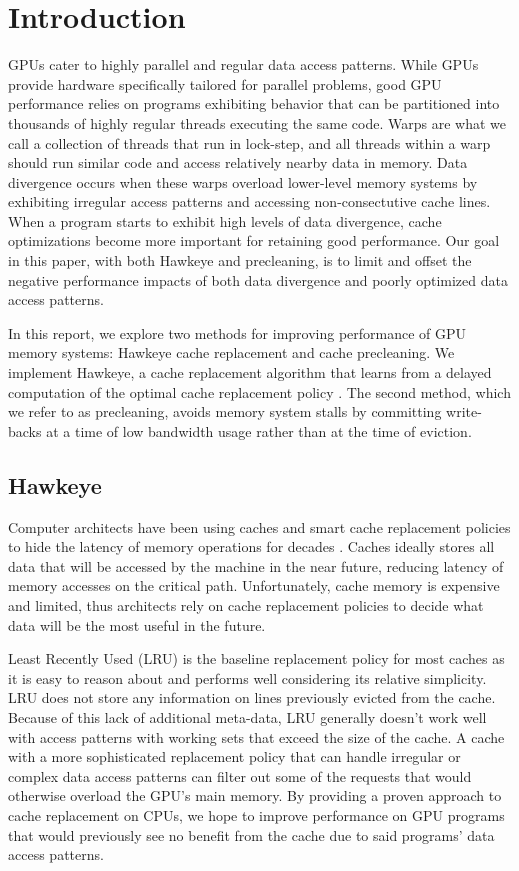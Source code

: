 \chapter{Introduction}

GPUs cater to highly parallel and regular data access patterns. While GPUs provide hardware specifically tailored for parallel problems, good GPU performance relies on programs exhibiting behavior that can be partitioned into thousands of highly regular threads executing the same code. Warps are what we call a collection of threads that run in lock-step, and all threads within a warp should run similar code and access relatively nearby data in memory. Data divergence occurs when these warps overload lower-level memory systems by exhibiting irregular access patterns and accessing non-consectutive cache lines. When a program starts to exhibit high levels of data divergence, cache optimizations become more important for retaining good performance. Our goal in this paper, with both Hawkeye and precleaning, is to limit and offset the negative performance impacts of both data divergence and poorly optimized data access patterns. 

In this report, we explore two methods for improving performance of GPU memory systems: Hawkeye cache replacement and cache precleaning. We implement Hawkeye, a cache replacement algorithm that learns from a delayed computation of the optimal cache replacement policy \cite{hawkeye}. The second method, which we refer to as precleaning, avoids memory system stalls by committing write-backs at a time of low bandwidth usage rather than at the time of eviction.

\section{Hawkeye}
Computer architects have been using caches and smart cache replacement policies to hide the latency of memory operations for decades \cite{deadblock,lruperf,cache_burst,dip,eva,rrip}. Caches ideally stores all data that will be accessed by the machine in the near future, reducing latency of memory accesses on the critical path. Unfortunately, cache memory is expensive and limited, thus architects rely on cache replacement policies to decide what data will be the most useful in the future.

Least Recently Used (LRU) is the baseline replacement policy for most caches as it is easy to reason about and performs well considering its relative simplicity. LRU does not store any information on lines previously evicted from the cache. Because of this lack of additional meta-data, LRU generally doesn't work well with access patterns with working sets that exceed the size of the cache. A cache with a more sophisticated replacement policy that can handle irregular or complex data access patterns can filter out some of the requests that would otherwise overload the GPU's main memory. By providing a proven approach to cache replacement on CPUs, we hope to improve performance on GPU programs that would previously see no benefit from the cache due to said programs’ data access patterns.


